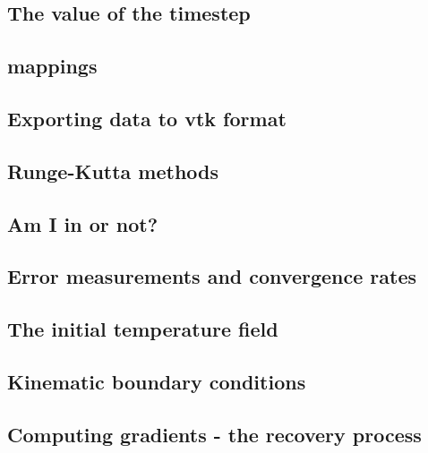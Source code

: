 \documentclass[a4paper]{article}
\begin{document}
\subsection{The value of the timestep}  %
\newpage %
\subsection{mappings}  %
\newpage %
\subsection{Exporting data to vtk format}  %
\newpage %
\subsection{Runge-Kutta methods}  %
\newpage %
\subsection{Am I in or not?}  %
\newpage %
\subsection{Error measurements and convergence rates}  %
\newpage %
\subsection{The initial temperature field}  %
\newpage %
\subsection{Kinematic boundary conditions}  %
\newpage %
\subsection{Computing gradients - the recovery process}  %
\newpage %
\end{document}
